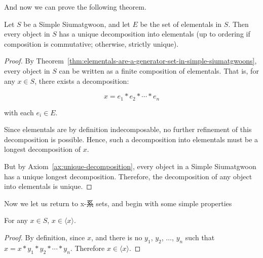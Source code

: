 And now we can prove the following theorem.
    
\begin{theorem}\label{thm:elementals-unique-decomposition}
    Let $S$ be a Simple Siumatgwoon, and let $E$ be the set of elementals in $S$. Then every object in $S$ has a unique decomposition into elementals (up to ordering if composition is commutative; otherwise, strictly unique).
\end{theorem}
    
\begin{proof}
    By Theorem~\ref{thm:elementals-are-a-generator-set-in-simple-siumatgwoons}, every object in $S$ can be written as a finite composition of elementals. That is, for any $x \in S$, there exists a decomposition:
    
    $$x = e_1 * e_2 * \cdots * e_n$$
    
    with each $e_i \in E$.
    
    Since elementals are by definition indecomposable, no further refinement of this decomposition is possible. Hence, such a decomposition into elementals must be a longest decomposition of $x$.

    But by Axiom~\ref{ax:unique-decomposition}, every object in a Simple Siumatgwoon has a unique longest decomposition. Therefore, the decomposition of any object into elementals is unique.
\end{proof}
    
Now we let us return to x-系 sets, and begin with some simple properties

\begin{lemma}\label{lem:an-object-is-in-its-own-emergence-set}
    For any $x\in S$, $x \in \langle x \rangle$.
\end{lemma}
\begin{proof}
    By definition, since $x$, and there is no $y_1$, $y_2$, $\ldots$, $y_n$ such that $x=x*y_1*y_2*\cdots*y_n$. Therefore $x \in \langle x \rangle$.
\end{proof}



